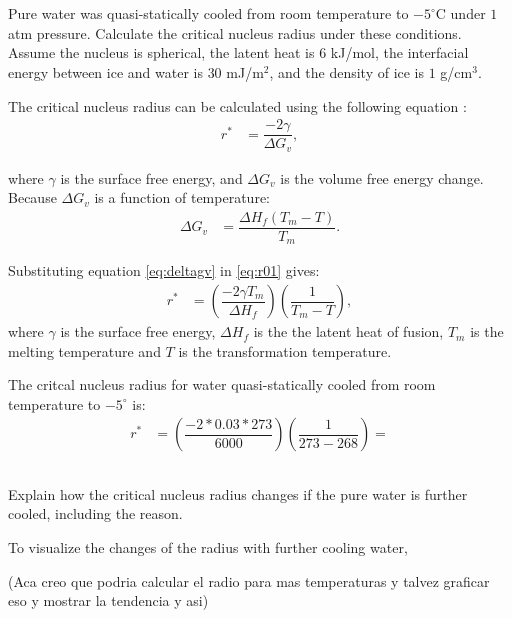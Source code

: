 \newpage
\section{}

\subsection{}
Pure water was quasi-statically cooled from room temperature to $-5^{\circ}$C under $1$ atm pressure. Calculate the critical nucleus radius under these conditions. Assume the nucleus is spherical, the latent heat is $6$ kJ/mol, the interfacial energy between ice and water is $30$ mJ/m$^2$, and the density of ice is $1$ g/cm$^3$.

The critical nucleus radius can be calculated using the following equation \citet{callister2010materials}: 
\begin{align}
  \label{eq:r01}
  r^*&=\dfrac{-2\gamma}{\Delta G_v},
\end{align}

where $\gamma$ is the surface free energy, and $\Delta G_v$ is the volume free energy change. Because $\Delta G_v$ is a function of temperature:
\begin{align}
  \label{eq:deltagv}
  \Delta G_v&= \dfrac{\Delta H_f\left(T_m-T\right)}{T_m}.
\end{align}

Substituting equation \ref{eq:deltagv} in \ref{eq:r01} gives: 
\begin{align}
  \label{eq:nucleus_radius}
  r^*&=\left(\dfrac{-2\gamma T_m}{\Delta H_f}\right)\left(\dfrac{1}{T_m - T}\right),
\end{align}
where $\gamma$ is the surface free energy, $\Delta H_f$ is the the latent heat of fusion, $T_m$ is the melting temperature and $T$ is the transformation temperature.

The critcal nucleus radius for water quasi-statically cooled from room temperature to $-5^{\circ}$ is:
\begin{align}
  \label{eq:radius}
  r^*&=\left(\dfrac{-2*0.03*273}{6000}\right)\left(\dfrac{1}{273-268}\right)=
\end{align}

\subsection{}
Explain how the critical nucleus radius changes if the pure water is
further cooled, including the reason.

To visualize the changes of the radius with further cooling water, 

(Aca creo que podria calcular el radio para mas temperaturas y talvez graficar eso y mostrar la tendencia y asi)